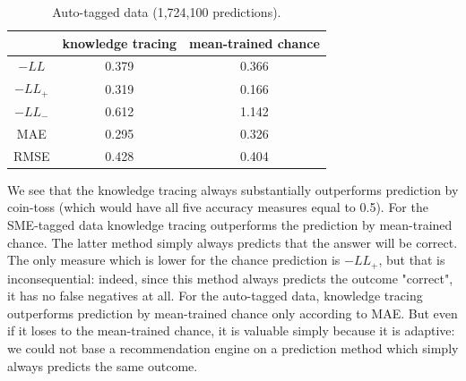 \documentclass{sigchi}
\newcommand{\1}{\mathbf{1}}
\begin{document}
\begin{table}[ht]
\caption{Auto-tagged data (1,724,100 predictions).}
\centering
\begin{tabular}{c c c}
\hline\hline
  & knowledge tracing & mean-trained chance\\ [0.5ex] %
\hline
$-LL$ & 0.379 & 0.366 \\
$-LL_{+}$ & 0.319 & 0.166 \\
$-LL_{-}$ & 0.612 & 1.142 \\
MAE & 0.295 & 0.326 \\
RMSE & 0.428  & 0.404 \\ [1ex]
\hline
\end{tabular}
\label{tableauto}
\end{table}
We see that the knowledge tracing always substantially outperforms prediction by coin-toss (which would have all five accuracy measures equal to 0.5). For the SME-tagged data knowledge tracing outperforms the prediction by mean-trained chance. The latter method simply always predicts that the answer will be correct. The only measure which is lower for the chance prediction is $-LL_{+}$, but that is inconsequential: indeed, since this method always predicts the outcome "correct", it has no false negatives at all. For the auto-tagged data, knowledge tracing outperforms prediction by mean-trained chance only according to MAE. But even if it loses to the mean-trained chance, it is valuable simply because it is adaptive: we could not base a recommendation engine on a prediction method which simply always predicts the same outcome.
\end{document}
